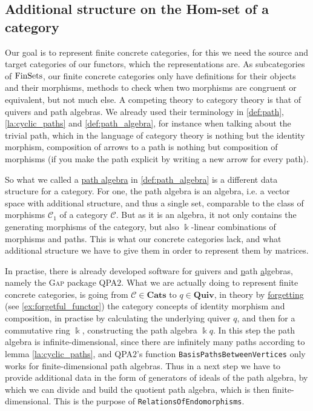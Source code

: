 
\subsection{Additional structure on the Hom-set of a category}

Our goal is to represent finite concrete categories, for this we need the source and target categories of our functors, which the
representations are.
As subcategories of $\textup{FinSets}$, our finite concrete categories only have definitions for their objects and their
morphisms, methods to check when two morphisms are congruent or equivalent, but not much else.
A competing theory to category theory is that of quivers and path algebras. We already used their terminology in
\ref{def:path}, \ref{la:cyclic_paths} and \ref{def:path_algebra}, for instance when talking about the trivial path,
which in the language of category theory is nothing but the identity morphism, composition of arrows to a path is nothing but
composition of morphisms (if you make the path explicit by writing a new arrow for every path).

So what we called a \ul{path algebra} in \ref{def:path_algebra} is a different data structure for a category. 
For one, the path algebra is an algebra, i.e. a vector space with additional structure, and thus a single set, comparable to the
class of morphisms $\mathcal{C}_{1}$ of a category $\mathcal{C}$.
But as it is an algebra, it not only contains the generating morphisms of the category, but also $\Bbbk$-linear combinations of
morphisms and paths. This is what our concrete categories lack, and what additional structure we have to give them in order
to represent them by matrices.

In practise, there is already developed software for \ul{q}uivers and \ul{p}ath \ul{a}lgebras, namely the \textsc{Gap} package
\textsc{QPA$2$}.
What we are actually doing to represent finite concrete categories, is going from $\mathcal{C} \in \mathbf{Cats}$ to $q \in \mathbf{Quiv}$,
in theory by \ul{forgetting} (see \ref{ex:forgetful_functor}) the category concepts of identity morphism and composition, in practise by calculating the
underlying quiver $q$, and then for a commutative ring $\Bbbk$, constructing the path algebra $\Bbbk q$. In this step the path algebra
is infinite-dimensional, since there are infinitely many paths according to lemma \ref{la:cyclic_paths}, and \textsc{QPA$2$}'s function
\texttt{BasisPathsBetweenVertices} only works for finite-dimensional path algebras. Thus in a next step we have to provide
additional data in the form of generators of ideals of the path algebra, by which we can divide and build the quotient path algebra,
which is then finite-dimensional. This is the purpose of \texttt{RelationsOfEndomorphisms}.

